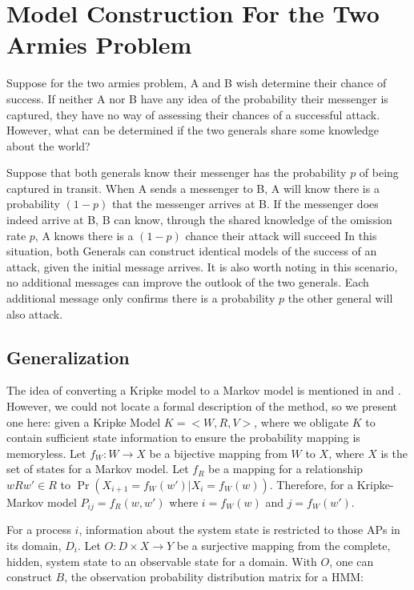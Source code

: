 \section{Model Construction For the Two Armies Problem}
Suppose for the two armies problem, A and B wish determine their chance of success.
If neither A nor B have any idea of the probability their messenger is captured, they have no way of assessing their chances of a successful attack.
However, what can be determined if the two generals share some knowledge about the world?

Suppose that both generals know their messenger has the probability $p$ of being captured in transit.
When A sends a messenger to B, A will know there is a probability $(1-p)$ that the messenger arrives at B.
If the messenger does indeed arrive at B, B can know, through the shared knowledge of the omission rate $p$, A knows there is a $(1-p)$ chance their attack will succeed
In this situation, both Generals can construct identical models of the success of an attack, given the initial message arrives.
It is also worth noting in this scenario, no additional messages can improve the outlook of the two generals.
Each additional message only confirms there is a probability $p$ the other general will also attack.

\subsection{Generalization}

The idea of converting a Kripke model to a Markov model is mentioned in \cite{kripkemarkov1} and \cite{kripkemarkov2}.
However, we could not locate a formal description of the method, so we present one here:
given a Kripke Model $K = <W,R,V>$, where we obligate $K$ to contain sufficient state information to ensure the probability mapping is memoryless.
Let $f_{W} : W \rightarrow X$ be a bijective mapping from $W$ to $X$, where $X$ is the set of states for a Markov model.
Let $f_{R}$ be a mapping for a relationship $wRw' \in R$ to $\Pr(X_{i+1}=f_W(w') | X_{i}=f_W(w))$.
Therefore, for a Kripke-Markov model $P_{ij} = f_R(w,w')$ where $i=f_W(w)$ and $j=f_W(w')$.

For a process $i$, information about the system state is restricted to those \ac{AP}s in its domain, $D_i$.
Let $O : D \times X \rightarrow Y$ be a surjective mapping from the complete, hidden, system state to an observable state for a domain.
With $O$, one can construct $B$, the observation probability distribution matrix for a \ac{HMM}:

